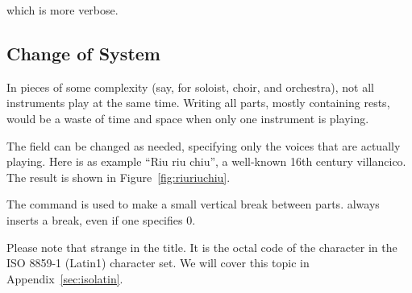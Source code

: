 \documentclass[a4paper,fullpage,12pt]{book}
\begin{document}
which is more verbose.


\subsection{Change of System}

In pieces of some complexity (say, for soloist, choir, and orchestra),
not all instruments play at the same time. Writing all parts, mostly
containing rests, would be a waste of time and space when only one
instrument is playing.

The  field can be changed as needed, specifying only
the voices that are actually playing. Here is as example ``Riu riu
chiu'', a well-known 16th century villancico. The result is shown in
Figure~\ref{fig:riuriuchiu}.

The  command is used to make a small vertical break
between parts.  always inserts a break, even if one
specifies 0. %

Please note that strange  in the title. It is the octal
code of the  character in the ISO 8859-1 (Latin1) character
set. We will cover this topic in Appendix~\ref{sec:isolatin}.

\end{document}
